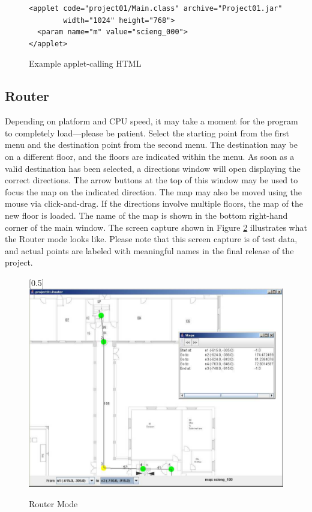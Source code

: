 \documentclass[12pt,letterpaper,titlepage]{article}   %
\begin{document}
\vspace{1em}
\begin{figure}[h]
\begin{verbatim}
<applet code="project01/Main.class" archive="Project01.jar"
        width="1024" height="768">
  <param name="m" value="scieng_000">
</applet>
\end{verbatim}
\caption{Example applet-calling HTML}
\label{applethtml}
\end{figure}

\subsection{Router}
Depending on platform and CPU speed, it may take a moment for the
program to completely load---please be patient. Select the starting
point from the first menu and the destination point from the second
menu.
The destination may be on a different floor, and the floors are
indicated within the menu. As soon as a valid destination has been
selected, a directions window will open displaying the correct
directions. The arrow buttons at the top of this window may be used to
focus the map on the indicated direction. The map may also be moved
using the mouse via click-and-drag. If the directions involve multiple
floors, the map of the new floor is loaded. The name of the map is shown
in the bottom right-hand corner of the main window. The screen capture
shown in Figure \ref{router-screenshot}
illustrates what the Router mode looks like. Please note that this
screen capture is of test data, and actual points are labeled with
meaningful names in the final release of the project.
\begin{figure}
\begin{center}
  \scalebox{0.5}[0.5]{\includegraphics{images/pdf/router-screenshot}}
\end{center}
\caption{Router Mode}
\label{router-screenshot}
\end{figure}
\end{document}
